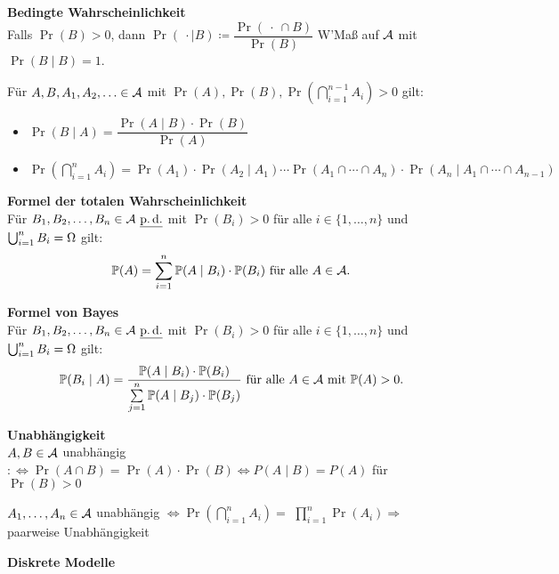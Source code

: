 \textbf{Bedingte Wahrscheinlichkeit}\\
Falls $\Pr(B) > 0$, dann
$\Pr(\ \cdot \mid B) \coloneqq \dfrac{\Pr(\ \cdot\ \cap B)}{\Pr(B)}$
W'Maß auf $\mathcal{A}$ mit $\Pr(B \mid B) = 1$.

Für $A,B,A_1,A_2,\ldots\in\mathcal{A}$ mit
$\Pr(A),\Pr(B), \Pr(\bigcap_{i=1}^{n-1} A_i) > 0$ gilt:

\begin{itemize}
\item $\Pr(B \mid A) = \dfrac{\Pr(A \mid B) \cdot \Pr(B)}{\Pr(A)}$
\item $\Pr(\bigcap_{i=1}^{n} A_i) = \Pr(A_1) \cdot \Pr(A_2 \mid A_1) \cdots
  \Pr(A_1 \cap \cdots \cap A_n) \cdot \Pr(A_n \mid A_1 \cap \cdots \cap A_{n-1})$
\end{itemize}

\textbf{Formel der totalen Wahrscheinlichkeit}\\
Für $B_1,B_2,\ldots,B_n\in\mathcal{A}\ \underline{\operatorname{p.d.}}$ mit $\Pr(B_i) > 0$ für alle
$i\in\{1,\ldots,n\}$ und $\bigcup_{i=1}^{n} B_i = \Omega$ gilt:
\[
  \mathbb{P}(A) = \sum_{i=1}^{n} \mathbb{P}(A \mid B_i) \cdot \mathbb{P}(B_i) \text{ für alle } A\in\mathcal{A}.
\]

\newpage

\textbf{Formel von Bayes}\\
Für $B_1,B_2,\ldots,B_n\in\mathcal{A}\ \underline{\operatorname{p.d.}}$ mit $\Pr(B_i) > 0$ für alle
$i\in\{1,\ldots,n\}$ und $\bigcup_{i=1}^{n} B_i = \Omega$ gilt:
\[
  \mathbb{P}(B_i \mid A)=
  \frac{\mathbb{P}(A \mid B_i) \cdot \mathbb{P}(B_i)}{\sum\limits_{j=1}^{n} \mathbb{P}(A \mid B_j)
  \cdot \mathbb{P}(B_j)} \text{ für alle } A\in\mathcal{A} \text{ mit } \mathbb{P}(A) > 0.
\]

\textbf{Unabhängigkeit}\\
$A,B\in\mathcal{A}$ unabhängig $:\Leftrightarrow \Pr(A \cap B) = \Pr(A) \cdot \Pr(B)
\Leftrightarrow P(A \mid B) = P(A)$ für $\Pr(B) > 0$

$A_1,\ldots,A_n\in\mathcal{A}$ unabhängig $\Leftrightarrow \Pr(\bigcap_{i=1}^{n} A_i) = $
$\prod_{i=1}^{n} \Pr(A_i) \Rightarrow $ paarweise Unabhängigkeit

\textbf{Diskrete Modelle}\\


